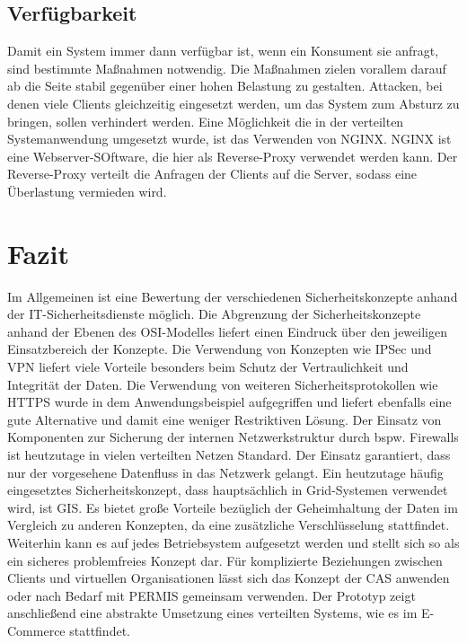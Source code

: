 \documentclass[utf8,biblatex]{lni}
\begin{document}
\subsection{Verfügbarkeit}

Damit ein System immer dann verfügbar ist, wenn ein Konsument sie anfragt, sind bestimmte Maßnahmen notwendig. Die Maßnahmen zielen vorallem
darauf ab die Seite stabil gegenüber einer hohen Belastung zu gestalten. Attacken, bei denen viele Clients gleichzeitig eingesetzt werden, um das System 
zum Absturz zu bringen, sollen verhindert werden. Eine Möglichkeit die in der verteilten Systemanwendung umgesetzt wurde, ist das Verwenden von NGINX.
NGINX ist eine Webserver-SOftware, die hier als Reverse-Proxy verwendet werden kann. Der Reverse-Proxy verteilt die Anfragen der Clients auf die Server, sodass
eine Überlastung vermieden wird.

\section{Fazit}

Im Allgemeinen ist eine Bewertung der verschiedenen Sicherheitskonzepte anhand der IT-Sicherheitsdienste 
möglich. Die Abgrenzung der Sicherheitskonzepte anhand der Ebenen des OSI-Modelles
liefert einen Eindruck über den jeweiligen Einsatzbereich der Konzepte. 
Die Verwendung von Konzepten wie IPSec und VPN liefert viele Vorteile besonders beim 
Schutz der Vertraulichkeit und Integrität der Daten. Die Verwendung von weiteren Sicherheitsprotokollen 
wie HTTPS wurde in dem Anwendungsbeispiel aufgegriffen und liefert ebenfalls eine gute Alternative und damit eine
weniger Restriktiven Lösung. 
Der Einsatz von Komponenten zur Sicherung der internen Netzwerkstruktur durch bspw. Firewalls ist heutzutage
in vielen verteilten Netzen Standard. Der Einsatz garantiert, dass nur der vorgesehene Datenfluss 
in das Netzwerk gelangt. 
Ein heutzutage häufig eingesetztes Sicherheitskonzept, dass hauptsächlich in Grid-Systemen verwendet wird, ist GIS. Es bietet große Vorteile bezüglich der Geheimhaltung der Daten im Vergleich zu 
anderen Konzepten, da eine zusätzliche Verschlüsselung stattfindet. Weiterhin kann es auf jedes Betriebsystem aufgesetzt werden und stellt sich so als ein sicheres problemfreies Konzept dar.
Für komplizierte Beziehungen zwischen Clients und virtuellen Organisationen lässt sich das Konzept der CAS anwenden oder nach Bedarf mit PERMIS gemeinsam verwenden.
\newline
Der Prototyp zeigt anschließend eine abstrakte Umsetzung eines verteilten Systems, wie es im E-Commerce stattfindet.

\printbibliography
\end{document}
